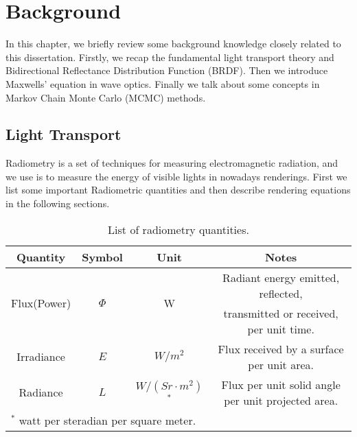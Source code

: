 \chapter{Background}
\label{cpt:background}

In this chapter, we briefly review some background knowledge closely related to this dissertation. Firstly, we recap the fundamental light transport theory and Bidirectional Reflectance Distribution Function (BRDF). Then we introduce Maxwells' equation in wave optics. Finally we talk about some concepts in Markov Chain Monte Carlo (MCMC) methods. 

\section{Light Transport}
Radiometry is a set of techniques for measuring electromagnetic radiation, and we use is to measure the energy of visible lights in nowadays renderings. First we list some important Radiometric quantities and then describe rendering equations in the following sections.

\begin{table}[!ht]
	\centering
	\caption[List of radiometry quantities]{\label{tab:background:notation}
		List of radiometry quantities.
	}
	\begin{tabular}{cccc}
		Quantity & Symbol & Unit & Notes \\
		\hline
		\multirow{2}{*}{Flux(Power)} & \multirow{2}{*}{$\Phi$} & \multirow{2}{*}{W} & Radiant energy emitted, reflected, \\
		 & & & transmitted or received, per unit time. \\[0.2em]
		Irradiance & $E$ & $W/m^2$ & Flux received by a surface per unit area. \\[0.2em]
		Radiance & $L$ & $W/(Sr\cdot m^2)$ $^*$ & Flux per unit solid angle per unit projected area. \\
		\hline
		\multicolumn{3}{l}{\footnotesize{$^*$ watt per steradian per square meter.}}	
	\end{tabular}
\end{table}

